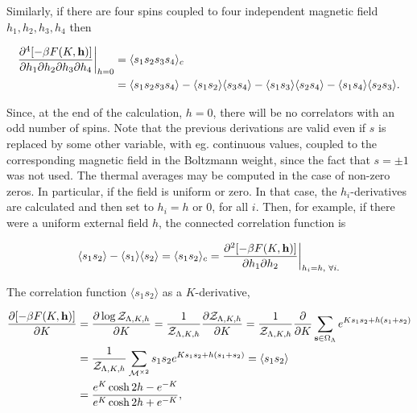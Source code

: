 \documentclass{homework}
\begin{document}
Similarly, if there are four spins coupled to four independent magnetic field $h_1, h_2, h_3, h_4$ then

\begin{equation}
    \begin{split}
        \frac{\partial^4 [-\beta F(K,{\bf h})]}{\partial h_1 \partial h_2 \partial h_3 \partial h_4}\bigg|_{h=0} &= \langle s_1 s_2 s_3 s_4 \rangle_c \\
        &= \langle s_1 s_2 s_3 s_4 \rangle - \langle s_1 s_2 \rangle \langle s_3 s_4 \rangle - \langle s_1 s_3 \rangle \langle s_2 s_4 \rangle - \langle s_1 s_4 \rangle \langle s_2 s_3 \rangle.
    \end{split}
\end{equation}

Since, at the end of the calculation, $h=0$, there will be no correlators with an odd number of spins. Note that the previous derivations are valid even if $s$ is replaced by some other variable, with eg. continuous values, coupled to the corresponding magnetic field in the Boltzmann weight, since the fact that $s = \pm 1$ was not used. The thermal averages may be computed in the case of non-zero zeros. In particular, if the field is uniform or zero. In that case, the $h_i$-derivatives are calculated and then set to $h_i = h$ or $0$, for all $i$. Then, for example, if there were a uniform external field $h$, the connected correlation function is 

\begin{equation}
    \begin{split}
        \langle s_1 s_2 \rangle - \langle s_1 \rangle \langle s_2 \rangle = \langle s_1 s_2 \rangle_c = \frac{\partial^2 [-\beta F(K,{\bf h})]}{\partial h_1 \partial h_2}\bigg|_{h_i = h, \textnormal{ } \forall i.}
    \end{split}
\end{equation}

The correlation function $\langle s_1 s_2 \rangle$ as a $K$-derivative, 

\begin{equation}
    \begin{split}
        \frac{\partial[-\beta F(K,{\bf h})]}{\partial K} &= \frac{\partial \log \mathcal{Z}_{\Lambda, K, h}}{\partial K} = \frac{1}{\mathcal{Z}_{\Lambda, K, h}}\frac{\partial \mathcal{Z}_{\Lambda, K, h}}{\partial K} = \frac{1}{\mathcal{Z}_{\Lambda, K, h}} \frac{\partial}{\partial K}  \sum_{{\bf s} \in \Omega_{\Lambda}} e^{K s_1 s_2 + h(s_1+s_2)} \\
        &= \frac{1}{\mathcal{Z}_{\Lambda, K, h}} \sum_{\mathcal{M}^{\times 2}} s_1 s_2 e^{K s_1 s_2 + h(s_1+s_2)} = \langle s_1 s_2 \rangle \\
        &= \frac{e^K \cosh 2h - e^{-K}}{e^K \cosh 2h + e^{-K}},
    \end{split}
\end{equation}
\end{document}
